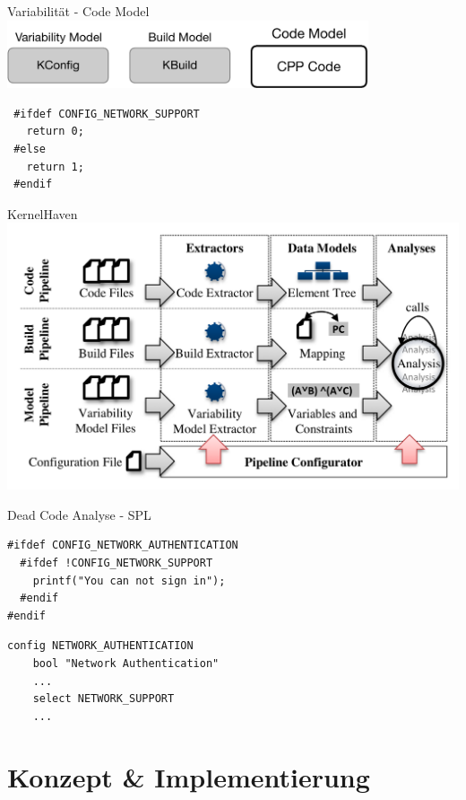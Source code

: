 \documentclass[aspectratio=43, noserifmath]{beamer}
\begin{document}
\begin{frame}[containsverbatim]{Variabilit\"at - Code Model}
\includegraphics[width=0.8\textwidth]{image/linux-build-system-3.pdf}
\begin{verbatim}
 #ifdef CONFIG_NETWORK_SUPPORT
   return 0;
 #else 
   return 1;
 #endif
\end{verbatim}
\end{frame}





\begin{frame}{KernelHaven}
\includegraphics[width=1\textwidth]{image/KernelHaven-Pipeline}
\end{frame}

\begin{frame}[containsverbatim]{Dead Code Analyse - SPL}

\begin{verbatim}
#ifdef CONFIG_NETWORK_AUTHENTICATION
  #ifdef !CONFIG_NETWORK_SUPPORT
    printf("You can not sign in");
  #endif
#endif
\end{verbatim}
\begin{verbatim}
config NETWORK_AUTHENTICATION
	bool "Network Authentication"
	...
	select NETWORK_SUPPORT
	...
\end{verbatim}
\end{frame}

\section{Konzept \& Implementierung}
\end{document}
